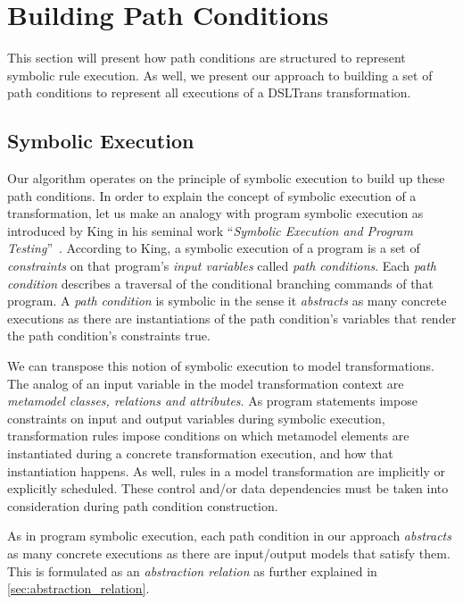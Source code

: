 \section{Building Path Conditions}
\label{sec:building_pcs}

This section will present how path conditions are structured to represent symbolic rule execution. As well, we present our approach to building a set of path conditions to represent all executions of a DSLTrans transformation.

\subsection{Symbolic Execution}

Our algorithm operates on the principle of symbolic execution to build up these
path conditions. In order to explain the concept of symbolic execution of a
transformation, let us make an analogy with program symbolic execution as
introduced by King in his seminal work ``\emph{Symbolic Execution and Program
Testing}''~\cite{DBLP:journals/cacm/King76}. According to King, a symbolic
execution of a program is a set of \emph{constraints} on that program's
\emph{input variables} called \emph{path conditions}. Each \emph{path condition}
describes a traversal of the conditional branching commands of that program. A
\emph{path condition} is symbolic in the sense it \emph{abstracts} as many
concrete executions as there are instantiations of the path condition's
variables that render the path condition's constraints true.

We can transpose this notion of symbolic execution to model transformations. The
analog of an input variable in the model transformation context are
\emph{metamodel classes, relations and attributes}. As program statements impose
constraints on input and output variables during symbolic execution,
transformation rules impose conditions on which metamodel elements are
instantiated during a concrete transformation execution, and how that
instantiation happens. As well, rules in a model transformation are implicitly
or explicitly scheduled. These control and/or data dependencies must be
taken into consideration during path condition construction.

As in program symbolic execution, each path condition in our approach \emph{abstracts} as many concrete executions as there are input/output models
that satisfy them. This is formulated as an \emph{abstraction relation} as further explained in \cref{sec:abstraction_relation}.

